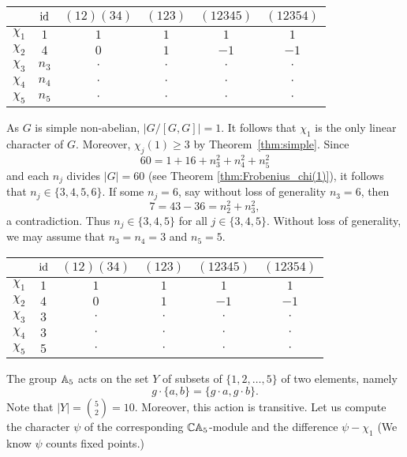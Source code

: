 \bigskip 
\begin{center}
        \begin{tabular}{|c|ccccc|}
        \hline  
         & $\operatorname{id}$ & $(12)(34)$ & $(123)$ & $(12345)$ & $(12354)$\\
        \hline 
        $\chi_1$ & $1$ & $1$ & $1$ & $1$ & $1$\\
        $\chi_2$ & $4$ & $0$ & $1$ & $-1$ & $-1$\\
        $\chi_3$ & $n_3$ & $\cdot$ & $\cdot$ & $\cdot$& $\cdot$\\
        $\chi_4$ & $n_4$ & $\cdot$ & $\cdot$ & $\cdot$& $\cdot$\\
        $\chi_5$ & $n_5$ & $\cdot$ & $\cdot$ & $\cdot$& $\cdot$\\
        \hline 
    \end{tabular}
\end{center}
\bigskip 

As $G$ is simple non-abelian, 
$|G/[G,G]|=1$. It follows that
$\chi_1$ is the only linear character of $G$. Moreover, 
$\chi_j(1)\geq3$ by Theorem~\ref{thm:simple}. Since 
\[
60=1+16+n_3^2+n_4^2+n_5^2
\]
and each $n_j$ divides $|G|=60$ 
(see Theorem \ref{thm:Frobenius_chi(1)}), it follows that 
$n_j\in\{3,4,5,6\}$. If some $n_j=6$, say without
loss of generality $n_3=6$, then 
\[
7=43-36=n_2^2+n_3^2, 
\]
a contradiction. Thus $n_j\in\{3,4,5\}$ for 
all $j\in\{3,4,5\}$. Without loss of generality, 
we may assume that $n_3=n_4=3$ and $n_5=5$. 

\bigskip 
\begin{center}
        \begin{tabular}{|c|ccccc|}
        \hline  
         & $\operatorname{id}$ & $(12)(34)$ & $(123)$ & $(12345)$ & $(12354)$\\
        \hline 
        $\chi_1$ & $1$ & $1$ & $1$ & $1$ & $1$\\
        $\chi_2$ & $4$ & $0$ & $1$ & $-1$ & $-1$\\
        $\chi_3$ & $3$ & $\cdot$ & $\cdot$ & $\cdot$& $\cdot$\\
        $\chi_4$ & $3$ & $\cdot$ & $\cdot$ & $\cdot$& $\cdot$\\
        $\chi_5$ & $5$ & $\cdot$ & $\cdot$ & $\cdot$& $\cdot$\\
        \hline 
    \end{tabular}
\end{center}
\bigskip 

The group $\mathbb{A}_5$ acts on the set $Y$ of subsets 
of $\{1,2,\dots,5\}$ of two elements, namely
\[
g\cdot \{a,b\}=\{g\cdot a,g\cdot b\}.
\]
Note that $|Y|=\binom{5}{2}=10$. Moreover, 
this action is transitive. Let us compute 
the character $\psi$ of the corresponding 
$\mathbb{C}\mathbb{A}_5$-module and the difference 
$\psi-\chi_1$ (We know $\psi$ counts
fixed points.)

